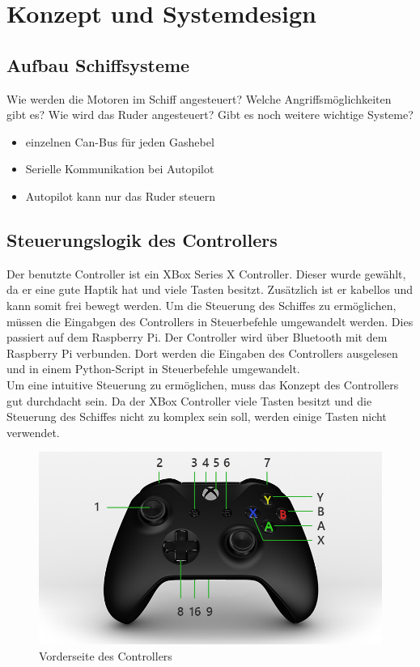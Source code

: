 \chapter{Konzept und Systemdesign}

\section{Aufbau Schiffsysteme}
Wie werden die Motoren im Schiff angesteuert?
Welche Angriffsmöglichkeiten gibt es?
Wie wird das Ruder angesteuert?
Gibt es noch weitere wichtige Systeme?
\begin{itemize}
    \item einzelnen Can-Bus für jeden Gashebel
    \item Serielle Kommunikation bei Autopilot
    \item Autopilot kann nur das Ruder steuern
\end{itemize}

\section{Steuerungslogik des Controllers}
Der benutzte Controller ist ein XBox Series X Controller. Dieser wurde gewählt, da er eine gute Haptik hat und 
viele Tasten besitzt. Zusätzlich ist er kabellos und kann somit frei bewegt werden. Um die Steuerung des Schiffes zu
ermöglichen, müssen die Eingabgen des Controllers in Steuerbefehle umgewandelt werden. Dies passiert auf dem 
Raspberry Pi. Der Controller wird über Bluetooth mit dem Raspberry Pi verbunden. Dort werden die Eingaben des Controllers
ausgelesen und in einem Python-Script in Steuerbefehle umgewandelt. \\
Um eine intuitive Steuerung zu ermöglichen, muss das Konzept des Controllers gut durchdacht sein.
Da der XBox Controller viele Tasten besitzt und die Steuerung des Schiffes nicht zu komplex sein soll,
werden einige Tasten nicht verwendet. 
\begin{figure}[H]
    \centering
    \includegraphics[scale=0.5]{images/vorderseite.jpg}
    \caption{Vorderseite des Controllers}
    \label{fig:vorderseite}
\end{figure}


